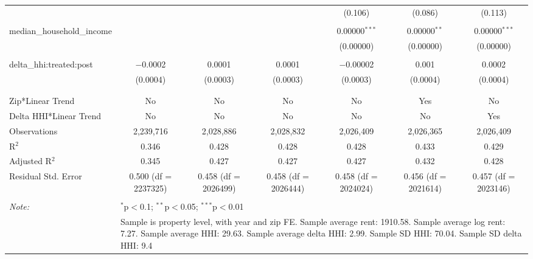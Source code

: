 \begin{table}[H]
{\begin{tabular}{@{\extracolsep{5pt}}lcccccc}
   &  &  &  & (0.106) & (0.086) & (0.113) \\  

   & & & & & & \\  

  median\_household\_income &  &  &  & 0.00000$^{***}$ & 0.00000$^{**}$ & 0.00000$^{***}$ \\  

   &  &  &  & (0.00000) & (0.00000) & (0.00000) \\  

   & & & & & & \\  

  delta\_hhi:treated:post & $-$0.0002 & 0.0001 & 0.0001 & $-$0.00002 & 0.001 & 0.0002 \\  

   & (0.0004) & (0.0003) & (0.0003) & (0.0003) & (0.0004) & (0.0004) \\  

   & & & & & & \\  

 \hline \\[-1.8ex]  

 Zip*Linear Trend & No & No & No & No & Yes & No \\  

 Delta HHI*Linear Trend & No & No & No & No & No & Yes \\  

 Observations & 2,239,716 & 2,028,886 & 2,028,832 & 2,026,409 & 2,026,365 & 2,026,409 \\  

 R$^{2}$ & 0.346 & 0.428 & 0.428 & 0.428 & 0.433 & 0.429 \\  

 Adjusted R$^{2}$ & 0.345 & 0.427 & 0.427 & 0.427 & 0.432 & 0.428 \\  

 Residual Std. Error & 0.500 (df = 2237325) & 0.458 (df = 2026499) & 0.458 (df = 2026444) & 0.458 (df = 2024024) & 0.456 (df = 2021614) & 0.457 (df = 2023146) \\  

 \hline  

 \hline \\[-1.8ex]  

 \textit{Note:}  & \multicolumn{6}{l}{$^{*}$p$<$0.1; $^{**}$p$<$0.05; $^{***}$p$<$0.01} \\  

  & \multicolumn{6}{l}{Sample is property level, with year and zip FE. Sample average rent: 1910.58. Sample average log rent: 7.27. Sample average HHI: 29.63. Sample average delta HHI: 2.99. Sample SD HHI: 70.04. Sample SD delta HHI: 9.4} \\  

 \end{tabular}}  

 \end{table}  

